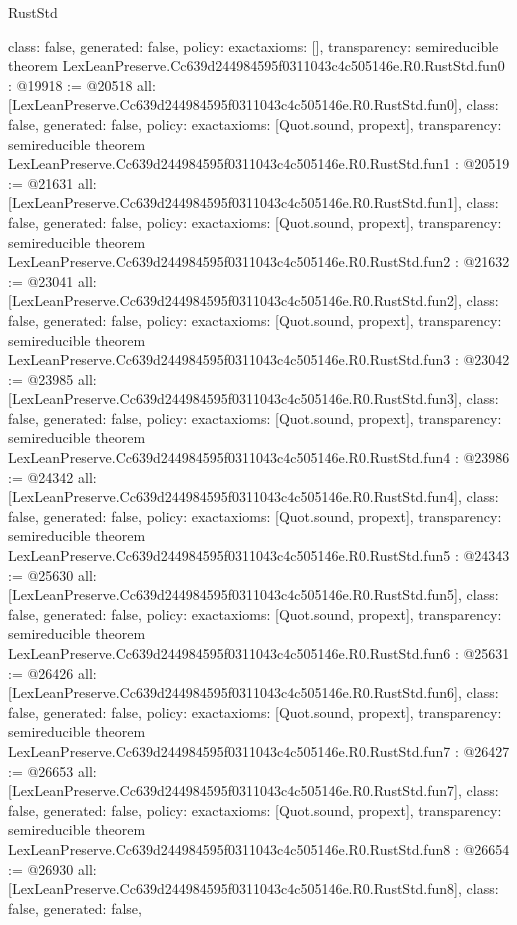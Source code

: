 \begin{lexlean}{RustStd}
\begin{coremodule}
{  class: false,
  generated: false,
  policy: exact{axioms: []},
  transparency: semireducible
}
theorem LexLeanPreserve.Cc639d244984595f0311043c4c505146e.R0.RustStd.fun0 : @19918 := @20518 {
  all: [LexLeanPreserve.Cc639d244984595f0311043c4c505146e.R0.RustStd.fun0],
  class: false,
  generated: false,
  policy: exact{axioms: [Quot.sound, propext]},
  transparency: semireducible
}
theorem LexLeanPreserve.Cc639d244984595f0311043c4c505146e.R0.RustStd.fun1 : @20519 := @21631 {
  all: [LexLeanPreserve.Cc639d244984595f0311043c4c505146e.R0.RustStd.fun1],
  class: false,
  generated: false,
  policy: exact{axioms: [Quot.sound, propext]},
  transparency: semireducible
}
theorem LexLeanPreserve.Cc639d244984595f0311043c4c505146e.R0.RustStd.fun2 : @21632 := @23041 {
  all: [LexLeanPreserve.Cc639d244984595f0311043c4c505146e.R0.RustStd.fun2],
  class: false,
  generated: false,
  policy: exact{axioms: [Quot.sound, propext]},
  transparency: semireducible
}
theorem LexLeanPreserve.Cc639d244984595f0311043c4c505146e.R0.RustStd.fun3 : @23042 := @23985 {
  all: [LexLeanPreserve.Cc639d244984595f0311043c4c505146e.R0.RustStd.fun3],
  class: false,
  generated: false,
  policy: exact{axioms: [Quot.sound, propext]},
  transparency: semireducible
}
theorem LexLeanPreserve.Cc639d244984595f0311043c4c505146e.R0.RustStd.fun4 : @23986 := @24342 {
  all: [LexLeanPreserve.Cc639d244984595f0311043c4c505146e.R0.RustStd.fun4],
  class: false,
  generated: false,
  policy: exact{axioms: [Quot.sound, propext]},
  transparency: semireducible
}
theorem LexLeanPreserve.Cc639d244984595f0311043c4c505146e.R0.RustStd.fun5 : @24343 := @25630 {
  all: [LexLeanPreserve.Cc639d244984595f0311043c4c505146e.R0.RustStd.fun5],
  class: false,
  generated: false,
  policy: exact{axioms: [Quot.sound, propext]},
  transparency: semireducible
}
theorem LexLeanPreserve.Cc639d244984595f0311043c4c505146e.R0.RustStd.fun6 : @25631 := @26426 {
  all: [LexLeanPreserve.Cc639d244984595f0311043c4c505146e.R0.RustStd.fun6],
  class: false,
  generated: false,
  policy: exact{axioms: [Quot.sound, propext]},
  transparency: semireducible
}
theorem LexLeanPreserve.Cc639d244984595f0311043c4c505146e.R0.RustStd.fun7 : @26427 := @26653 {
  all: [LexLeanPreserve.Cc639d244984595f0311043c4c505146e.R0.RustStd.fun7],
  class: false,
  generated: false,
  policy: exact{axioms: [Quot.sound, propext]},
  transparency: semireducible
}
theorem LexLeanPreserve.Cc639d244984595f0311043c4c505146e.R0.RustStd.fun8 : @26654 := @26930 {
  all: [LexLeanPreserve.Cc639d244984595f0311043c4c505146e.R0.RustStd.fun8],
  class: false,
  generated: false,
}
\end{coremodule}
\end{lexlean}

